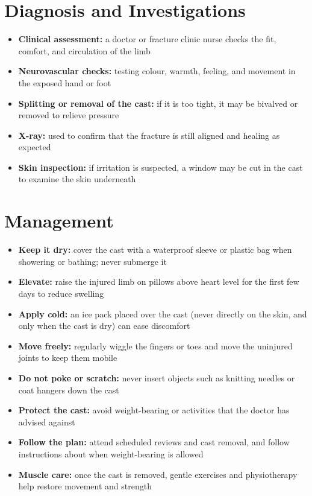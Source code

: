 \section*{Diagnosis and Investigations}
\begin{itemize}
    \item \textbf{Clinical assessment:} a doctor or fracture clinic nurse checks the fit, comfort, and circulation of the limb
    \item \textbf{Neurovascular checks:} testing colour, warmth, feeling, and movement in the exposed hand or foot
    \item \textbf{Splitting or removal of the cast:} if it is too tight, it may be bivalved or removed to relieve pressure
    \item \textbf{X-ray:} used to confirm that the fracture is still aligned and healing as expected
    \item \textbf{Skin inspection:} if irritation is suspected, a window may be cut in the cast to examine the skin underneath
\end{itemize}

\section*{Management}
\begin{itemize}
    \item \textbf{Keep it dry:} cover the cast with a waterproof sleeve or plastic bag when showering or bathing; never submerge it
    \item \textbf{Elevate:} raise the injured limb on pillows above heart level for the first few days to reduce swelling
    \item \textbf{Apply cold:} an ice pack placed over the cast (never directly on the skin, and only when the cast is dry) can ease discomfort
    \item \textbf{Move freely:} regularly wiggle the fingers or toes and move the uninjured joints to keep them mobile
    \item \textbf{Do not poke or scratch:} never insert objects such as knitting needles or coat hangers down the cast
    \item \textbf{Protect the cast:} avoid weight-bearing or activities that the doctor has advised against
    \item \textbf{Follow the plan:} attend scheduled reviews and cast removal, and follow instructions about when weight-bearing is allowed
    \item \textbf{Muscle care:} once the cast is removed, gentle exercises and physiotherapy help restore movement and strength
\end{itemize}

